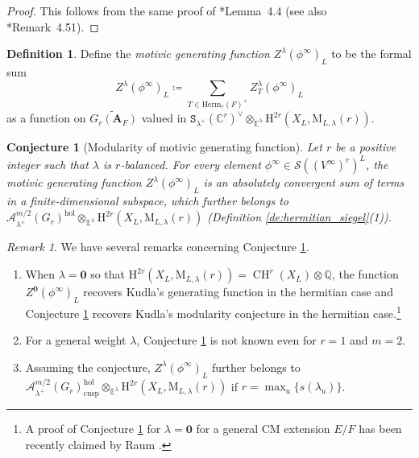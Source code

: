 \documentclass[12pt]{amsart}
\numberwithin{equation}{section}
\theoremstyle{plain}
\newtheorem{conjecture}[proposition]{Conjecture}
\theoremstyle{definition}
\newtheorem{definition}[proposition]{Definition}
\theoremstyle{remark}
\newtheorem{remark}[proposition]{Remark}
\renewcommand{\b}[1]{\mathbf{#1}}
\renewcommand{\c}[1]{\mathcal{#1}}
\renewcommand{\d}[1]{\mathbb{#1}}
\renewcommand{\r}[1]{\mathrm{#1}}
\newcommand{\s}[1]{\mathscr{#1}}
\renewcommand{\(}{\left(}
\renewcommand{\)}{\right)}
\newcommand{\bA}{\b A}
\newcommand{\cA}{\c A}
\newcommand{\dC}{\d C}
\newcommand{\dE}{\d E}
\newcommand{\dQ}{\d Q}
\newcommand{\rH}{\r H}
\newcommand{\rM}{\r M}
\newcommand{\sS}{\s S}
\newcommand{\tS}{\mathtt{S}}
\newcommand{\cusp}{\r{cusp}}
\newcommand{\Herm}{\r{Herm}}
\newcommand{\hol}{\r{hol}}
\DeclareMathOperator{\CH}{CH}
\begin{document}
\begin{proof}
This follows from the same proof of \cite{LL21}*{Lemma~4.4} (see also \cite{DL24}*{Remark~4.51}).
\end{proof}


\begin{definition}\label{de:generating_function}
Define the \emph{motivic generating function} $Z^\lambda(\phi^\infty)_L$ to be the formal sum
\[
Z^\lambda(\phi^\infty)_L\coloneqq\sum_{T\in\Herm_r(F)^+}Z^\lambda_T(\phi^\infty)_L
\]
as a function on $\widetilde{G_r(\bA_F)}$ valued in $\tS_{\lambda^+}(\dC^r)^\vee\otimes_{\dE^\lambda}\rH^{2r}(X_L,\rM_{L,\lambda}(r))$.
\end{definition}



\begin{conjecture}[Modularity of motivic generating function]\label{co:modularity}
Let $r$ be a positive integer such that $\lambda$ is $r$-balanced. For every element $\phi^\infty\in\sS((V^\infty)^r)^L$, the motivic generating function $Z^\lambda(\phi^\infty)_L$ is an absolutely convergent sum of terms in a finite-dimensional subspace, which further belongs to $\cA^{m/2}_{\lambda^+}(G_r)^\hol\otimes_{\dE^\lambda}\rH^{2r}(X_L,\rM_{L,\lambda}(r))$ (Definition \ref{de:hermitian_siegel}(1)).
\end{conjecture}



\begin{remark}
We have several remarks concerning Conjecture \ref{co:modularity}.
\begin{enumerate}
  \item When $\lambda=\b{0}$ so that $\rH^{2r}(X_L,\rM_{L,\lambda}(r))=\CH^r(X_L)\otimes\dQ$, the function $Z^{\b{0}}(\phi^\infty)_L$ recovers Kudla's generating function in the hermitian case and Conjecture \ref{co:modularity} recovers Kudla's modularity conjecture in the hermitian case.\footnote{A proof of Conjecture \ref{co:modularity} for $\lambda=\b{0}$ for a general CM extension $E/F$ has been recently claimed by Raum \cite{Rau26}.}

  \item For a general weight $\lambda$, Conjecture \ref{co:modularity} is not known even for $r=1$ and $m=2$.

  \item Assuming the conjecture, $Z^\lambda(\phi^\infty)_L$ further belongs to $\cA^{m/2}_{\lambda^+}(G_r)^\hol_\cusp\otimes_{\dE^\lambda}\rH^{2r}(X_L,\rM_{L,\lambda}(r))$ if $r=\max_u\{s(\lambda_u)\}$.
\end{enumerate}
\end{remark}
\end{document}
